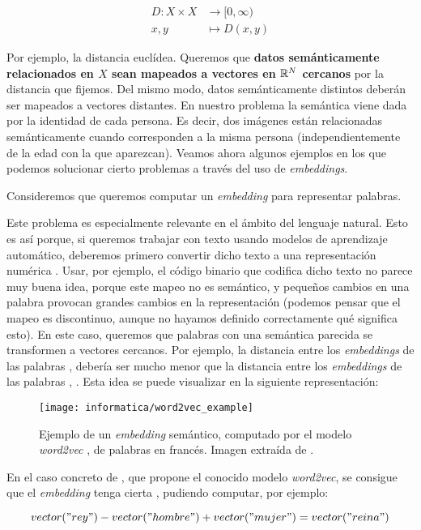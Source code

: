 \begin{equation}
	\begin{split}
		D: X \times X & \to [0, \infty) \\
		x, y & \mapsto D(x, y)
	\end{split}
\end{equation}

Por ejemplo, la distancia euclídea. Queremos que \textbf{datos semánticamente relacionados en $X$ sean mapeados a vectores en $\mathbb{R}^N$ cercanos} por la distancia que fijemos. Del mismo modo, datos semánticamente distintos deberán ser mapeados a vectores distantes. En nuestro problema la semántica viene dada por la identidad de cada persona. Es decir, dos imágenes están relacionadas semánticamente cuando corresponden a la misma persona (independientemente de la edad con la que aparezcan). Veamos ahora algunos ejemplos en los que podemos solucionar cierto problemas a través del uso de \textit{embeddings}.

\begin{ejemplo}
	Consideremos que queremos computar un \textit{embedding} para representar palabras.

	Este problema es especialmente relevante en el ámbito del lenguaje natural. Esto es así porque, si queremos trabajar con texto usando modelos de aprendizaje automático, deberemos primero convertir dicho texto a una representación numérica \cite{informatica:word_embeddings_survey}. Usar, por ejemplo, el código binario que codifica dicho texto no parece muy buena idea, porque este mapeo no es semántico, y pequeños cambios en una palabra provocan grandes cambios en la representación (podemos pensar que el mapeo es discontinuo, aunque no hayamos definido correctamente qué significa esto). En este caso, queremos que palabras con una semántica parecida se transformen a vectores cercanos. Por ejemplo, la distancia entre los \textit{embeddings} de las palabras ,  debería ser mucho menor que la distancia entre los \textit{embeddings} de las palabras , . Esta idea se puede visualizar en la siguiente representación:

	\begin{figure}[H]
		\centering
		\texttt{[image: informatica/word2vec\_example]}
		\caption{Ejemplo de un \textit{embedding} semántico, computado por el modelo \textit{word2vec} \cite{informatica:word2vec}, de palabras en francés. Imagen extraída de \cite{informatica:word2vec_cran_package}.}
	\end{figure}

	En el caso concreto de \cite{informatica:word2vec}, que propone el conocido modelo \textit{word2vec}, se consigue que el \textit{embedding} tenga cierta , pudiendo computar, por ejemplo:

	\begin{equation}
		vector("rey") - vector("hombre") + vector("mujer") = vector("reina")
	\end{equation}
\end{ejemplo}

